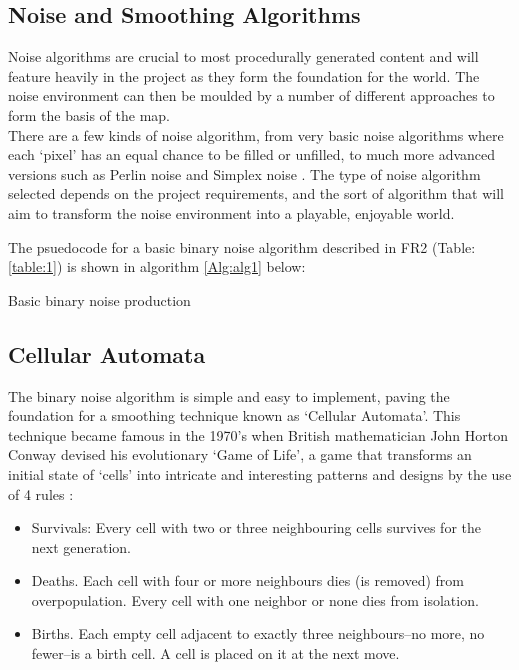 \documentclass[12pt,a4paper]{article}
\begin{document}
\subsection{Noise and Smoothing Algorithms}
\label{subsec:noise}

Noise algorithms are crucial to most procedurally generated content and will feature heavily in the project as they form the foundation for the world. The noise environment can then be moulded by a number of different approaches to form the basis of the map. \\

There are a few kinds of noise algorithm, from very basic noise algorithms where each `pixel' has an equal chance to be filled or unfilled, to much more advanced versions such as Perlin noise and Simplex noise \cite{textmodel}\cite{improvepnoise}. The type of noise algorithm selected depends on the project requirements, and the sort of algorithm that will aim to transform the noise environment into a playable, enjoyable world. 

The psuedocode for a basic binary noise algorithm described in FR2 (Table:\ref{table:1}) is shown in algorithm \ref{Alg:alg1} below:

\begin{algorithm}
	\caption{Basic binary noise production}
	\label{Alg:alg1}
\end{algorithm}

\subsection{Cellular Automata}

The binary noise algorithm is simple and easy to implement, paving the foundation for a smoothing technique known as `Cellular Automata'. This technique became famous in the 1970's when British mathematician John Horton Conway devised his evolutionary `Game of Life', a game that transforms an initial state of `cells' into intricate and interesting patterns and designs by the use of 4 rules \cite{cellauto}: 

\begin{itemize}
	\item Survivals: Every cell with two or three neighbouring cells survives for the next generation.
	\item Deaths. Each cell with four or more neighbours dies (is removed) from overpopulation. Every cell with one neighbor or none dies from isolation.
	\item Births. Each empty cell adjacent to exactly three neighbours--no more, no fewer--is a birth cell. A cell is placed on it at the next move.
\end{itemize}
\end{document}
